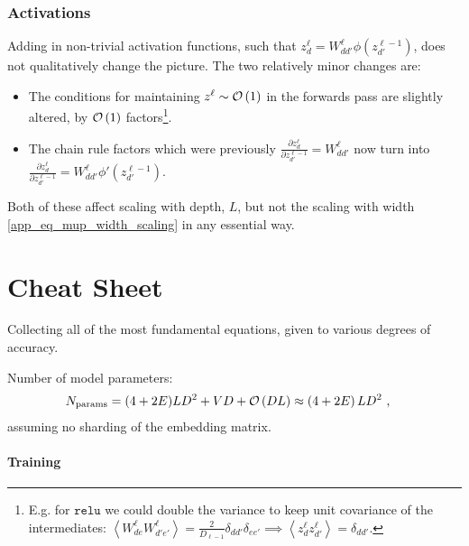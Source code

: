 \subsubsection{Activations}

Adding in non-trivial activation functions, such that $ z^{ \ell }_{ d } = W^{ \ell }_{ dd' }
\phi\left ( z^{ \ell-1 }_{ d' } \right )  $, does not qualitatively change the picture. The two
relatively minor changes are:
\begin{itemize}
    \item The conditions for maintaining $ z^{ \ell }\sim \mathcal{O} \left( 1 \right)  $ in the forwards
        pass are slightly altered, by $ \mathcal{O} \left( 1  \right)  $ factors\footnote{E.g. for $
        \texttt{relu} $ we could double the variance to keep unit covariance of the intermediates: $
        \left\langle W^{ \ell  }_{ de } W^{ \ell }_{
    d'e'  }  \right\rangle = \frac{ 2 }{ D_{ \ell-1  } }\delta_{ dd'  }\delta_{ ee'  }  \implies
\left\langle z^{ \ell  }_{ d }z^{ \ell  }_{ d' } \right\rangle= \delta_{ dd' }$.}.
    \item The chain rule factors which
    were previously $ \frac{ \partial z^{ \ell }_{ d } }{ \partial z^{ \ell-1 }_{ d' } } = W ^{ \ell }_{
    dd' } $ now turn into $ \frac{ \partial z^{ \ell }_{ d } }{ \partial z^{ \ell-1 }_{ d' } } = W ^{ \ell }_{
    dd' }\phi'\left ( z^{ \ell-1 }_{ d' } \right ) $.
\end{itemize}
Both of these affect scaling with depth, $ L $, but not the scaling with width
\eqref{app_eq_mup_width_scaling} in any essential way.









\section{Cheat Sheet \label{app_cheat_sheet}}
Collecting all of the most fundamental equations, given to various degrees of accuracy.

Number of model parameters:
\begin{align}
	N _{ {\rm params} } & =   (4+2E)LD ^{ 2 } + VD+ \mathcal{O} \left( DL \right) \approx   \left ( 4+2E \right )LD ^{ 2 }\ ,
\end{align}
assuming no sharding of the embedding matrix.


\paragraph{Training}

